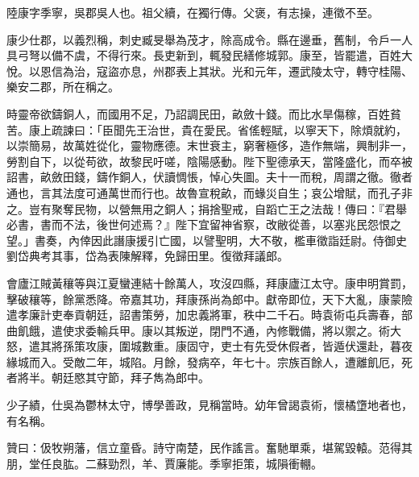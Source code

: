 \begin{pinyinscope}
陸康字季寧，吳郡吳人也。祖父續，在獨行傳。父褒，有志操，連徵不至。

康少仕郡，以義烈稱，刺史臧旻舉為茂才，除高成令。縣在邊垂，舊制，令戶一人具弓弩以備不虞，不得行來。長吏新到，輒發民繕修城郭。康至，皆罷遣，百姓大悅。以恩信為治，寇盜亦息，州郡表上其狀。光和元年，遷武陵太守，轉守桂陽、樂安二郡，所在稱之。

時靈帝欲鑄銅人，而國用不足，乃詔調民田，畝斂十錢。而比水旱傷稼，百姓貧苦。康上疏諫曰：「臣聞先王治世，貴在愛民。省傜輕賦，以寧天下，除煩就約，以崇簡易，故萬姓從化，靈物應德。末世衰主，窮奢極侈，造作無端，興制非一，勞割自下，以從苟欲，故黎民吁嗟，陰陽感動。陛下聖德承天，當隆盛化，而卒被詔書，畝斂田錢，鑄作銅人，伏讀惆悵，悼心失圖。夫十一而稅，周謂之徹。徹者通也，言其法度可通萬世而行也。故魯宣稅畝，而蝝災自生；哀公增賦，而孔子非之。豈有聚奪民物，以營無用之銅人；捐捨聖戒，自蹈亡王之法哉！傳曰：『君舉必書，書而不法，後世何述焉？』陛下宜留神省察，改敝從善，以塞兆民怨恨之望。」書奏，內倖因此譖康援引亡國，以譬聖明，大不敬，檻車徵詣廷尉。侍御史劉岱典考其事，岱為表陳解釋，免歸田里。復徵拜議郎。

會廬江賊黃穰等與江夏蠻連結十餘萬人，攻沒四縣，拜康廬江太守。康申明賞罰，擊破穰等，餘黨悉降。帝嘉其功，拜康孫尚為郎中。獻帝即位，天下大亂，康蒙險遣孝廉計吏奉貢朝廷，詔書策勞，加忠義將軍，秩中二千石。時袁術屯兵壽春，部曲飢餓，遣使求委輸兵甲。康以其叛逆，閉門不通，內修戰備，將以禦之。術大怒，遣其將孫策攻康，圍城數重。康固守，吏士有先受休假者，皆遁伏還赴，暮夜緣城而入。受敵二年，城陷。月餘，發病卒，年七十。宗族百餘人，遭離飢厄，死者將半。朝廷愍其守節，拜子雋為郎中。

少子績，仕吳為鬱林太守，博學善政，見稱當時。幼年曾謁袁術，懷橘墯地者也，有名稱。

贊曰：伋牧朔藩，信立童昏。詩守南楚，民作謠言。奮馳單乘，堪駕毀轅。范得其朋，堂任良肱。二蘇勁烈，羊、賈廉能。季寧拒策，城隕衝輣。


\end{pinyinscope}